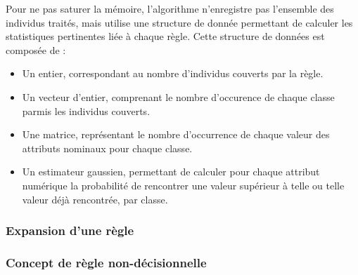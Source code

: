             Pour ne pas saturer la mémoire, l’algorithme n’enregistre pas l’ensemble des individus traités, mais utilise une structure de donnée permettant de calculer les statistiques pertinentes liée à chaque règle. Cette structure de données est composée de : 
            \begin{itemize}
                \item Un entier, correspondant au nombre d’individus couverts par la règle.
                \item Un vecteur d’entier, comprenant le nombre d’occurence de chaque classe parmis les individus couverts.
                \item Une matrice, représentant le nombre d'occurrence de chaque valeur des attributs nominaux pour chaque classe.
                \item Un estimateur gaussien, permettant de calculer pour chaque attribut numérique la probabilité de rencontrer une valeur supérieur à telle ou telle valeur déjà rencontrée, par classe.
            \end{itemize}

        \subsubsection{Expansion d'une règle}
        \subsubsection{Concept de règle non-décisionnelle}





